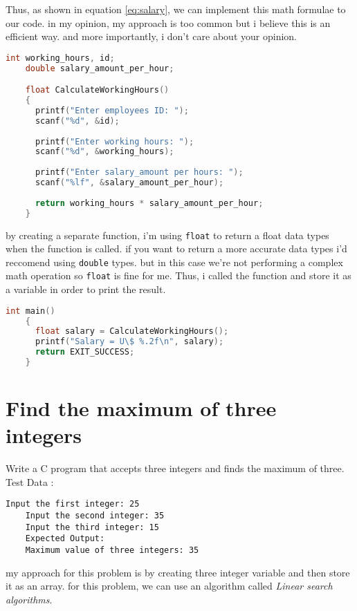 \documentclass{article}
\begin{document}
  Thus, as shown in equation \ref{eq:salary}, we can implement this math formulae to our code. in my opinion, my approach is too common but i believe this is an efficient way. and more importantly, i don't care about your opinion.
  \begin{lstlisting}[language=C, caption=Code Implementation]
    int working_hours, id;
    double salary_amount_per_hour;

    float CalculateWorkingHours()
    {
      printf("Enter employees ID: ");
      scanf("%d", &id);
      
      printf("Enter working hours: ");
      scanf("%d", &working_hours);
    
      printf("Enter salary_amount per hours: ");
      scanf("%lf", &salary_amount_per_hour);
    
      return working_hours * salary_amount_per_hour;
    }
  \end{lstlisting}
  by creating a separate function, i'm using \texttt{float} to return a float data types when the function is called. if you want to return a more accurate data types
  i'd reccomend using \texttt{double} types. but in this case we're not performing a complex math operation so \texttt{float} is fine for me.
  Thus, i called the function and store it as a variable in order to print the result. 
  \begin{lstlisting}[language=C, caption=Call the function]
    int main()
    {
      float salary = CalculateWorkingHours();
      printf("Salary = U\$ %.2f\n", salary);
      return EXIT_SUCCESS;
    }
  \end{lstlisting}

  \clearpage

  \section{Find the maximum of three integers}
  
  Write a C program that accepts three integers and finds the maximum of three. Test Data :
  
  \begin{lstlisting}[style=plainstyle]
    Input the first integer: 25
    Input the second integer: 35
    Input the third integer: 15
    Expected Output:
    Maximum value of three integers: 35 
  \end{lstlisting}

  my approach for this problem is by creating three integer variable and then store it as an array. for this problem, we can use 
  an algorithm called \textit{Linear search algorithms}. 
\end{document}
